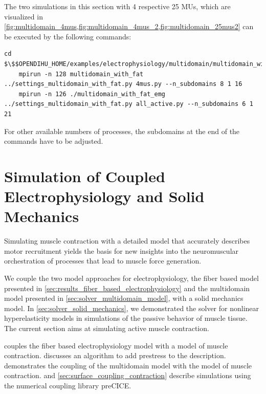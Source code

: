 \begin{reproduce_no_break}
  The two simulations in this section with 4 respective 25 MUs, which are visualized in \cref{fig:multidomain_4mus,fig:multidomain_4mus_2,fig:multidomain_25mus2} can be executed by the following commands:
  \begin{lstlisting}[columns=fullflexible,breaklines=true,postbreak=\mbox{\textcolor{gray}{$\hookrightarrow$}\space}]
    cd $\$$OPENDIHU_HOME/examples/electrophysiology/multidomain/multidomain_with_fat/build_release
    mpirun -n 128 multidomain_with_fat ../settings_multidomain_with_fat.py 4mus.py --n_subdomains 8 1 16
    mpirun -n 126 ./multidomain_with_fat_emg ../settings_multidomain_with_fat.py all_active.py --n_subdomains 6 1 21
  \end{lstlisting}
  For other available numbers of processes, the subdomains at the end of the commands have to be adjusted.
\end{reproduce_no_break}



\section{Simulation of Coupled Electrophysiology and Solid Mechanics}\label{sec:coupled_electrophysiology_and_solid_mechanics}

Simulating muscle contraction with a detailed model that accurately describes motor recruitment
yields the basis for new insights into the neuromuscular orchestration of processes that lead to muscle force generation.

We couple the two model approaches for electrophysiology, the fiber based model presented in \cref{sec:results_fiber_based_electrophysiology} and the multidomain model presented in \cref{sec:solver_multidomain_model}, with a solid mechanics model. 
In \cref{sec:solver_solid_mechanics}, we demonstrated the solver for nonlinear hyperelasticity models in simulations of the passive behavior of muscle tissue. The current section aims at simulating active muscle contraction.

 couples the fiber based electrophysiology model with a model of muscle contraction.  discusses an algorithm to add prestress to the description.  demonstrates the coupling of the multidomain model with the model of muscle contraction.  and \cref{sec:surface_coupling_contraction} describe simulations using the numerical coupling library preCICE.

